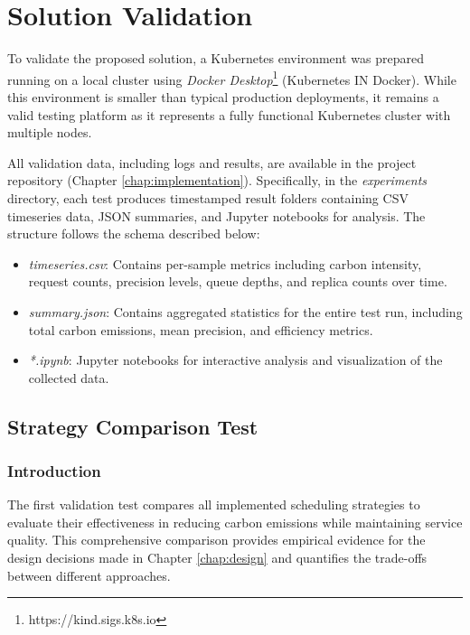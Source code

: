 \chapter{Solution Validation}\label{chap:validation}

To validate the proposed solution, a Kubernetes environment was prepared running on a local cluster using \textit{Docker Desktop}\footnote{https://kind.sigs.k8s.io} (Kubernetes IN Docker). While this environment is smaller than typical production deployments, it remains a valid testing platform as it represents a fully functional Kubernetes cluster with multiple nodes.

All validation data, including logs and results, are available in the project repository (Chapter \ref{chap:implementation}). Specifically, in the \textit{experiments} directory, each test produces timestamped result folders containing CSV timeseries data, JSON summaries, and Jupyter notebooks for analysis. The structure follows the schema described below:

\begin{itemize}
    \item \textit{timeseries.csv}: Contains per-sample metrics including carbon intensity, request counts, precision levels, queue depths, and replica counts over time.
    \item \textit{summary.json}: Contains aggregated statistics for the entire test run, including total carbon emissions, mean precision, and efficiency metrics.
    \item \textit{*.ipynb}: Jupyter notebooks for interactive analysis and visualization of the collected data.
\end{itemize}

\section{Strategy Comparison Test}\label{sect:strategy-comparison}

\subsection{Introduction}

The first validation test compares all implemented scheduling strategies to evaluate their effectiveness in reducing carbon emissions while maintaining service quality. This comprehensive comparison provides empirical evidence for the design decisions made in Chapter \ref{chap:design} and quantifies the trade-offs between different approaches.

